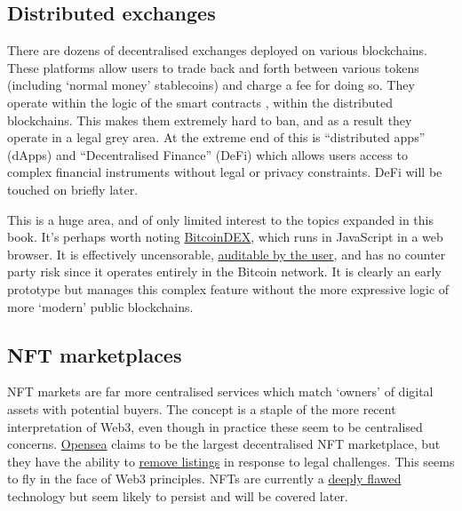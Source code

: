 \subsection{Distributed exchanges}
There are dozens of decentralised exchanges deployed on various blockchains. These platforms allow users to trade back and forth between various tokens (including `normal money' stablecoins) and charge a fee for doing so. They operate within the logic of the smart contracts \cite{szabo1997formalizing}, within the distributed blockchains. This makes them extremely hard to ban, and as a result they operate in a legal grey area. At the extreme end of this is ``distributed apps'' (dApps) and ``Decentralised Finance'' (DeFi) which allows users access to complex financial instruments without legal or privacy constraints. DeFi will be touched on briefly later.\par
This is a huge area, and of only limited interest to the topics expanded in this book. It's perhaps worth noting \href{https://bitcoin-dex.net/about/index.html}{BitcoinDEX}, which runs in JavaScript in a web browser. It is effectively uncensorable, \href{https://bitcoin-dex.net/tokens.js}{auditable by the user}, and has no counter party risk since it operates entirely in the Bitcoin network. It is clearly an early prototype but manages this complex feature without the more expressive logic of more `modern' public blockchains.
\subsection{NFT marketplaces}
NFT markets are far more centralised services which match `owners' of digital assets with potential buyers. The concept is a staple of the more recent interpretation of Web3, even though in practice these seem to be centralised concerns. \href{https://opensea.io/}{Opensea} claims to be the largest decentralised NFT marketplace, but they have the ability to \href{https://thedefiant.io/sad-frogs-delisted-opensea/}{remove listings} in response to legal challenges. This seems to fly in the face of Web3 principles. NFTs are currently a \href{https://tante.cc/2021/12/17/the-third-web/}{deeply flawed} technology but seem likely to persist and will be covered later.

